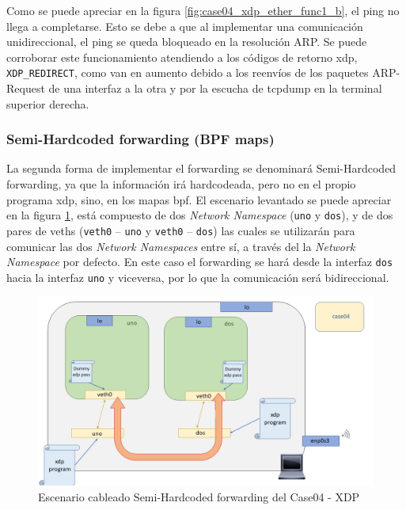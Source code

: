 Como se puede apreciar en la figura \ref{fig:case04_xdp_ether_func1_b}, el ping \hspace{1mm} no llega a completarse. Esto se debe a que al implementar una comunicación unidireccional, el ping se queda bloqueado en la resolución ARP. Se puede corroborar este funcionamiento atendiendo a los códigos de retorno \gls{xdp}, \texttt{XDP\_REDIRECT}, como van en aumento debido a los reenvíos de los paquetes ARP-Request de una interfaz a la otra y por la escucha de tcpdump en la terminal superior derecha. 

\subsubsection{Semi-Hardcoded forwarding (BPF maps)}

La segunda forma de implementar el forwarding se denominará Semi-Hardcoded forwarding, ya que la información irá hardcodeada, pero no en el propio programa \gls{xdp}, sino, en los mapas \gls{bpf}. El escenario levantado se puede apreciar en la figura \ref{fig:case04_xdp_ether_scenario2}, está compuesto de dos \textit{Network Namespace} (\texttt{uno} y \texttt{dos}), y de dos pares de \gls{veth}s (\texttt{veth0} -- \texttt{uno} y \texttt{veth0} -- \texttt{dos}) las cuales se utilizarán para comunicar las dos \textit{Network Namespaces} entre sí, a través del la \textit{Network Namespace} por defecto. En este caso el forwarding se hará desde la interfaz \texttt{dos} hacia la interfaz \texttt{uno} y viceversa, por lo que la comunicación será bidireccional.

\begin{figure}[ht]
    \centering
    \includegraphics[width=14cm]{archivos/img/dev/xdp/case04/scenario_02.png}
    \caption{Escenario cableado Semi-Hardcoded forwarding del Case04 - XDP}
    \label{fig:case04_xdp_ether_scenario2}
\end{figure}

